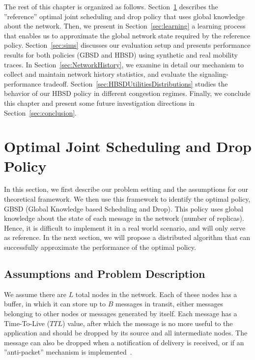 The rest of this chapter is organized as follows. Section~\ref{sec:optimal-policy} describes the ''reference'' optimal joint scheduling and drop policy that uses global knowledge about the network. Then, we present in Section~\ref{sec:learning} a learning process that enables us to approximate the global network state required by the reference policy. Section~\ref{sec:sims} discusses our evaluation setup and presents performance results for both policies (GBSD and HBSD) using synthetic and real mobility traces. In Section~\ref{sec:NetworkHistory}, we examine in detail our mechanism to collect and maintain network history statistics, and evaluate the signaling-performance tradeoff. Section~\ref{sec:HBSDUtilitiesDistributions} studies the behavior of our HBSD policy in different congestion regimes. Finally, we conclude this chapter and present some future investigation directions in Section~\ref{sec:conclusion}.

\section{Optimal Joint Scheduling and Drop Policy}
\label{sec:optimal-policy}

In this section, we first describe our problem setting and the assumptions for our theoretical framework. We then use this framework to identify the optimal policy, GBSD (Global Knowledge based Scheduling and Drop). This policy uses global knowledge about the state of each message in the network (number of replicas). Hence, it is difficult to implement it in a real world scenario, and will only serve as reference. In the next section, we will propose a distributed algorithm that can successfully approximate the performance of the optimal policy.

\subsection{Assumptions and Problem Description}
\label{subsec:ProblemDescription}

We assume there are $L$ total nodes in the network. Each of these nodes has a buffer, in which it can store up to $B$ messages in transit, either messages belonging to other nodes or messages generated by itself. Each message has a Time-To-Live ($TTL$) value, after which the message is no more useful to the application and should be dropped by its source and all intermediate nodes. The message can also be dropped when a notification of delivery is received, or if an ''anti-packet'' mechanism is implemented~\cite{Towsley:Epidemic}.

